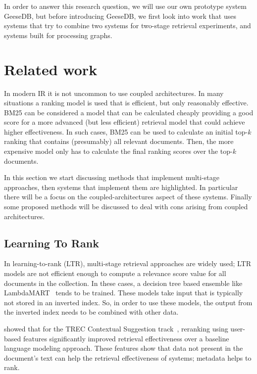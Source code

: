 In order to answer this research question, we will use our own prototype system GeeseDB, but before introducing GeeseDB, we first look into work that uses systems that try to combine two systems for two-stage retrieval experiments, and systems built for processing graphs.


\section{Related work }
In modern IR it is not uncommon to use coupled architectures. In many situations a ranking model is used that is efficient, but only reasonably effective. BM25 can be considered a model that can be calculated cheaply providing a good score for a more advanced (but less efficient) retrieval model that could achieve higher effectiveness. In such cases, BM25 can be used to calculate an initial top-$k$ ranking that contains (presumably) all relevant documents. Then, the more expensive model only has to calculate the final ranking scores over the top-$k$ documents.

In this section we start discussing methods that implement multi-stage approaches, then systems that implement them are highlighted. In particular there will be a focus on the coupled-architectures aspect of these systems. Finally some proposed methods will be discussed to deal with cons arising from coupled architectures. 

\subsection{Learning To Rank}
In learning-to-rank (LTR), multi-stage retrieval approaches are widely used; LTR models are not efficient enough to compute a relevance score value for all documents in the collection.
In these cases, a decision tree based ensemble like LambdaMART~\citep{lambdamart} tends to be trained. These models take input that is typically not stored in an inverted index. So, in order to use these models, the output from the inverted index needs to be combined with other data.

 showed that for the TREC Contextual Suggestion track~\citep{contextual-suggestion-track}, reranking using user-based features significantly improved retrieval effectiveness over a baseline language modeling approach. These features show that data not present in the document's text can help the retrieval effectiveness of systems; metadata helps to rank. 

